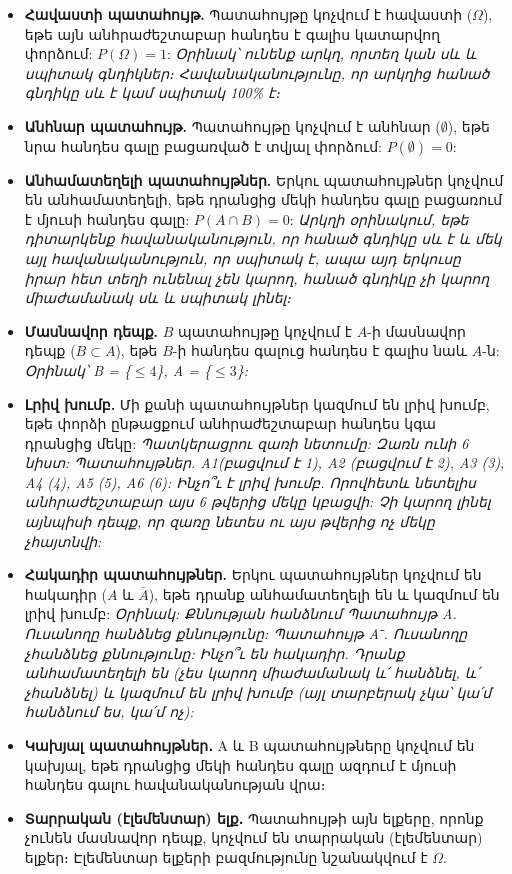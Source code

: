 \documentclass[12pt, a4paper]{article}
\begin{document}
\begin{itemize}
    \item \textbf{Հավաստի պատահույթ.} Պատահույթը կոչվում է հավաստի ($\Omega$), եթե այն անհրաժեշտաբար հանդես է գալիս կատարվող փորձում: $P(\Omega) = 1$:
	\textit{Օրինակ՝ ունենք արկղ, որտեղ կան սև և սպիտակ գնդիկներ։ Հավանականությունը, որ արկղից հանած գնդիկը սև է կամ սպիտակ 100\% է։}
    \item \textbf{Անհնար պատահույթ.} Պատահույթը կոչվում է անհնար ($\emptyset$), եթե նրա հանդես գալը բացառված է տվյալ փորձում: $P(\emptyset) = 0$:
    \item \textbf{Անհամատեղելի պատահույթներ.} Երկու պատահույթներ կոչվում են անհամատեղելի, եթե դրանցից մեկի հանդես գալը բացառում է մյուսի հանդես գալը: $P(A \cap B) = 0$:
	\textit{Արկղի օրինակում, եթե դիտարկենք հավանականություն, որ հանած գնդիկը սև է և մեկ այլ հավանականություն, որ սպիտակ է, ապա այդ երկուսը իրար հետ տեղի ունենալ չեն կարող, հանած գնդիկը չի կարող միաժամանակ սև և սպիտակ լինել։} 
    \item \textbf{Մասնավոր դեպք.} $B$ պատահույթը կոչվում է $A$-ի մասնավոր դեպք ($B \subset A$), եթե $B$-ի հանդես գալուց հանդես է գալիս նաև $A$-ն:
	\textit{Օրինակ՝ B = \{$\le 4$\}, A = \{$\le 3$\}:}
    \item \textbf{Լրիվ խումբ.} Մի քանի պատահույթներ կազմում են լրիվ խումբ, եթե փորձի ընթացքում անհրաժեշտաբար հանդես կգա դրանցից մեկը:
    \textit{Պատկերացրու զառի նետումը: Զառն ունի 6 նիստ:
    Պատահույթներ. A1​ (բացվում է 1), A2​ (բացվում է 2), A3​ (3), A4​ (4), A5​ (5), A6​ (6):
    Ինչո՞ւ է լրիվ խումբ. Որովհետև նետելիս անհրաժեշտաբար այս 6 թվերից մեկը կբացվի: Չի կարող լինել այնպիսի դեպք, որ զառը նետես ու այս թվերից ոչ մեկը չհայտնվի:}
    \item \textbf{Հակադիր պատահույթներ.} Երկու պատահույթներ կոչվում են հակադիր ($A$ և $\bar{A}$), եթե դրանք անհամատեղելի են և կազմում են լրիվ խումբ:
    \textit{Օրինակ: Քննության հանձնում
    Պատահույթ A. Ուսանողը հանձնեց քննությունը:
    Պատահույթ Aˉ. Ուսանողը չհանձնեց քննությունը:
    Ինչո՞ւ են հակադիր. Դրանք անհամատեղելի են (չես կարող միաժամանակ և՛ հանձնել, և՛ չհանձնել) և կազմում են լրիվ խումբ (այլ տարբերակ չկա՝ կա՛մ հանձնում ես, կա՛մ ոչ):}
    \item \textbf{Կախյալ պատահույթներ․} A և B պատահույթները կոչվում են կախյալ, եթե դրանցից մեկի հանդես գալը ազդում է մյուսի հանդես գալու հավանականության վրա։
    \item \textbf{Տարրական (էլեմենտար) ելք․} Պատահույթի այն ելքերը, որոնք չունեն մասնավոր դեպք, կոչվում են տարրական (էլեմենտար) ելքեր։ Էլեմենտար ելքերի բազմությունը նշանակվում է $\Omega$.
\end{itemize}
\end{document}
